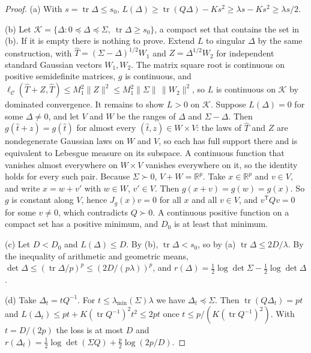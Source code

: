 \documentclass[11pt,onecolumn]{IEEEtran}
\newcommand{\R}{\mathbb{R}}
\newcommand{\tr}{\operatorname{tr}}
\newcommand{\lmin}{\lambda_{\min}}
\begin{document}
\begin{proof}
(a) With $s=\tr\Delta\le s_0$,
$L(\Delta)\ge\tr(Q\Delta)-Ks^2\ge\lambda s-Ks^2\ge\lambda s/2$.

(b) Let $\mathcal K=\{\Delta:0\preceq\Delta\preceq\Sigma,\ \tr\Delta\ge s_0\}$, a compact
set that contains the set in (b). If it is empty there is nothing to prove. Extend $L$ to singular $\Delta$ by the same
construction, with $\hat T=(\Sigma-\Delta)^{1/2}W_1$ and $Z=\Delta^{1/2}W_2$ for
independent standard Gaussian vectors $W_1,W_2$. The matrix square root is continuous on
positive semidefinite matrices, $g$ is continuous, and
$\ell_{\mathcal C}(\hat T+Z,\hat T)\le M_1^2\|Z\|^2\le M_1^2\|\Sigma\|\,\|W_2\|^2$, so $L$
is continuous on $\mathcal K$ by dominated convergence. It remains to show $L>0$ on
$\mathcal K$. Suppose $L(\Delta)=0$ for some $\Delta\ne0$, and let $V$ and $W$ be the
ranges of $\Delta$ and $\Sigma-\Delta$. Then $g(\hat t+z)=g(\hat t)$ for almost every
$(\hat t,z)\in W\times V$: the laws of $\hat T$ and $Z$ are nondegenerate Gaussian laws
on $W$ and $V$, so each has full support there and is equivalent to Lebesgue measure on
its subspace. A continuous function that vanishes almost everywhere on $W\times V$
vanishes everywhere on it, so the identity holds for every such pair. Because
$\Sigma\succ0$, $V+W=\R^p$. Take $x\in\R^p$ and $v\in V$, and write $x=w+v'$ with
$w\in W$, $v'\in V$. Then $g(x+v)=g(w)=g(x)$. So $g$ is constant along $V$, hence
$J_g(x)v=0$ for all $x$ and all $v\in V$, and $v^{\mathsf T}Qv=0$ for some $v\ne0$,
which contradicts $Q\succ0$. A continuous positive function on a compact set has a
positive minimum, and $D_0$ is at least that minimum.

(c) Let $D<D_0$ and $L(\Delta)\le D$. By (b), $\tr\Delta<s_0$, so by (a)
$\tr\Delta\le2D/\lambda$. By the inequality of arithmetic and geometric means,
$\det\Delta\le(\tr\Delta/p)^p\le(2D/(p\lambda))^p$, and
$r(\Delta)=\tfrac12\log\det\Sigma-\tfrac12\log\det\Delta$.

(d) Take $\Delta_t=tQ^{-1}$. For $t\le\lmin(\Sigma)\lambda$ we have
$\Delta_t\preceq\Sigma$. Then $\tr(Q\Delta_t)=pt$ and
$L(\Delta_t)\le pt+K(\tr Q^{-1})^2t^2\le 2pt$ once
$t\le p/(K(\tr Q^{-1})^2)$. With $t=D/(2p)$ the loss is at most $D$ and
$r(\Delta_t)=\tfrac12\log\det(\Sigma Q)+\tfrac p2\log(2p/D)$.
\end{proof}
\end{document}
